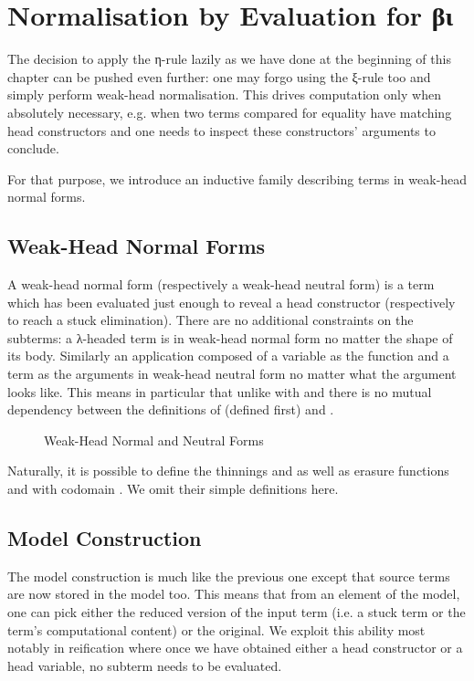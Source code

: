 \section{Normalisation by Evaluation for βι}

The decision to apply the η-rule lazily as we have done at the beginning of
this chapter can be pushed even further: one may forgo using the ξ-rule too
and simply perform weak-head normalisation. This drives computation only when
absolutely necessary, e.g. when two terms compared for equality have matching
head constructors and one needs to inspect these constructors' arguments to
conclude.

For that purpose, we introduce an inductive family describing terms in
weak-head normal forms.

\subsection{Weak-Head Normal Forms}

A weak-head normal form (respectively a weak-head neutral form) is a term
which has been evaluated just enough to reveal a head constructor
(respectively to reach a stuck elimination). There are no additional
constraints on the subterms: a λ-headed term is in weak-head normal form
no matter the shape of its body. Similarly an application composed of a
variable as the function and a term as the arguments in weak-head neutral
form no matter what the argument looks like. This means in particular
that unlike with  and  there is no mutual dependency between
the definitions of  (defined first) and .

\begin{figure}[h]
\caption{Weak-Head Normal and Neutral Forms\label{fig:weakhead}}
\end{figure}

Naturally, it is possible to define the thinnings
 and 
as well as erasure
functions  and 
with codomain . We omit their simple definitions here.

\subsection{Model Construction}

The model construction is much like the previous one except
that source terms are now stored in the model too. This means that
from an element of the model, one can pick either the reduced version
of the input term (i.e. a stuck term or the term's computational
content) or the original. We exploit this ability most
notably in reification where once we have obtained either a
head constructor or a head variable, no subterm needs to
be evaluated.

